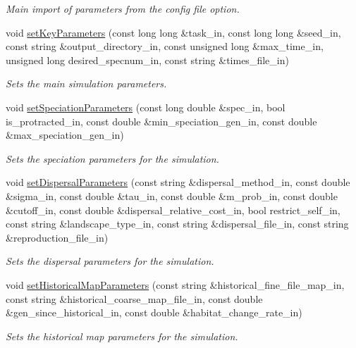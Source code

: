 \begin{DoxyCompactItemize}
\begin{DoxyCompactList}\small\item\em Main import of parameters from the config file option. \end{DoxyCompactList}\item 
void \hyperlink{struct_sim_parameters_aa6684caccd53613a5d08ff4071d0edc9}{set\+Key\+Parameters} (const long long \&task\+\_\+in, const long long \&seed\+\_\+in, const string \&output\+\_\+directory\+\_\+in, const unsigned long \&max\+\_\+time\+\_\+in, unsigned long desired\+\_\+specnum\+\_\+in, const string \&times\+\_\+file\+\_\+in)
\begin{DoxyCompactList}\small\item\em Sets the main simulation parameters. \end{DoxyCompactList}\item 
void \hyperlink{struct_sim_parameters_a6753a70e7b9183c97fb1b304b089968d}{set\+Speciation\+Parameters} (const long double \&spec\+\_\+in, bool is\+\_\+protracted\+\_\+in, const double \&min\+\_\+speciation\+\_\+gen\+\_\+in, const double \&max\+\_\+speciation\+\_\+gen\+\_\+in)
\begin{DoxyCompactList}\small\item\em Sets the speciation parameters for the simulation. \end{DoxyCompactList}\item 
void \hyperlink{struct_sim_parameters_a74782aab11b1e07a507cc60bdec3bf95}{set\+Dispersal\+Parameters} (const string \&dispersal\+\_\+method\+\_\+in, const double \&sigma\+\_\+in, const double \&tau\+\_\+in, const double \&m\+\_\+prob\+\_\+in, const double \&cutoff\+\_\+in, const double \&dispersal\+\_\+relative\+\_\+cost\+\_\+in, bool restrict\+\_\+self\+\_\+in, const string \&landscape\+\_\+type\+\_\+in, const string \&dispersal\+\_\+file\+\_\+in, const string \&reproduction\+\_\+file\+\_\+in)
\begin{DoxyCompactList}\small\item\em Sets the dispersal parameters for the simulation. \end{DoxyCompactList}\item 
void \hyperlink{struct_sim_parameters_afae472eb2788205a8587db87778f0333}{set\+Historical\+Map\+Parameters} (const string \&historical\+\_\+fine\+\_\+file\+\_\+map\+\_\+in, const string \&historical\+\_\+coarse\+\_\+map\+\_\+file\+\_\+in, const double \&gen\+\_\+since\+\_\+historical\+\_\+in, const double \&habitat\+\_\+change\+\_\+rate\+\_\+in)
\begin{DoxyCompactList}\small\item\em Sets the historical map parameters for the simulation. \end{DoxyCompactList}\item 

\end{DoxyCompactItemize}

